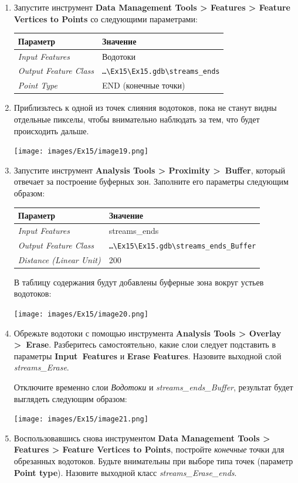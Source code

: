 \documentclass[12pt,]{book}
\begin{document}
\begin{enumerate}
\def\labelenumi{\arabic{enumi}.}
\item
  Запустите инструмент \textbf{Data Management Tools \textgreater{} Features \textgreater{} Feature Vertices to Points} со следующими параметрами:

  \begin{longtable}[]{@{}ll@{}}
  \toprule
  Параметр & Значение\tabularnewline
  \midrule
  \endhead
  \emph{Input Features} & Водотоки\tabularnewline
  \emph{Output Feature Class} & \texttt{\ldots{}\textbackslash{}Ex15\textbackslash{}Ex15.gdb\textbackslash{}streams\_ends}\tabularnewline
  \emph{Point Type} & END (конечные точки)\tabularnewline
  \bottomrule
  \end{longtable}
\item
  Приблизьтесь к одной из точек слияния водотоков, пока не станут видны отдельные пикселы, чтобы внимательно наблюдать за тем, что будет происходить дальше.

  \texttt{[image: images/Ex15/image19.png]}
\item
  Запустите инструмент \textbf{Analysis Tools \textgreater{} Proximity \textgreater{}~Buffer}, который отвечает за построение буферных зон. Заполните его параметры следующим образом:

  \begin{longtable}[]{@{}ll@{}}
  \toprule
  Параметр & Значение\tabularnewline
  \midrule
  \endhead
  \emph{Input Features} & streams\_ends\tabularnewline
  \emph{Output Feature Class} & \texttt{\ldots{}\textbackslash{}Ex15\textbackslash{}Ex15.gdb\textbackslash{}streams\_ends\_Buffer}\tabularnewline
  \emph{Distance (Linear Unit)} & 200\tabularnewline
  \bottomrule
  \end{longtable}

  В таблицу содержания будут добавлены буферные зона вокруг устьев водотоков:

  \texttt{[image: images/Ex15/image20.png]}
\item
  Обрежьте водотоки с помощью инструмента \textbf{Analysis Tools \textgreater{} Overlay \textgreater{}~Erase}. Разберитесь самостоятельно, какие слои следует подставить в параметры \textbf{Input~Features} и \textbf{Erase Features}. Назовите выходной слой \emph{streams\_Erase}.

  Отключите временно слои \emph{Водотоки} и \emph{streams\_ends\_Buffer}, результат будет выглядеть следующим образом:

  \texttt{[image: images/Ex15/image21.png]}
\item
  Воспользовавшись снова инструментом \textbf{Data Management Tools \textgreater{} Features \textgreater{} Feature Vertices to Points}, постройте \emph{конечные} точки для обрезанных водотоков. Будьте внимательны при выборе типа точек (параметр \textbf{Point type}). Назовите выходной класс \emph{streams\_Erase\_ends}.


\end{enumerate}
\end{document}
